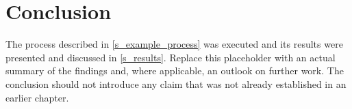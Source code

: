 \chapter{Conclusion}%
\label{s_conclusion}

The process described in \cref{s_example_process} was executed and its
results were presented and discussed in \cref{s_results}. Replace this
placeholder with an actual summary of the findings and, where
applicable, an outlook on further work. The conclusion should not
introduce any claim that was not already established in an earlier
chapter.
